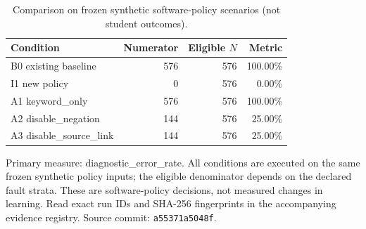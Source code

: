\begin{table}[htbp]
\centering
\small
\caption{Comparison on frozen synthetic software-policy scenarios (not student outcomes).}
\label{tab:ln-08-policy-benchmark}
\begin{tabular}{lrrr}
\toprule
Condition & Numerator & Eligible $N$ & Metric \\
\midrule
B0 existing baseline & 576 & 576 & 100.00\% \\
I1 new policy & 0 & 576 & 0.00\% \\
A1 keyword\_only & 576 & 576 & 100.00\% \\
A2 disable\_negation & 144 & 576 & 25.00\% \\
A3 disable\_source\_link & 144 & 576 & 25.00\% \\
\bottomrule
\end{tabular}
\par\smallskip
\begin{minipage}{0.98\linewidth}\footnotesize
Primary measure: diagnostic\_error\_rate. All conditions are executed on the same frozen synthetic policy inputs; the eligible denominator depends on the declared fault strata. These are software-policy decisions, not measured changes in learning. Read exact run IDs and SHA-256 fingerprints in the accompanying evidence registry. Source commit: \texttt{a55371a5048f}.
\end{minipage}
\end{table}
